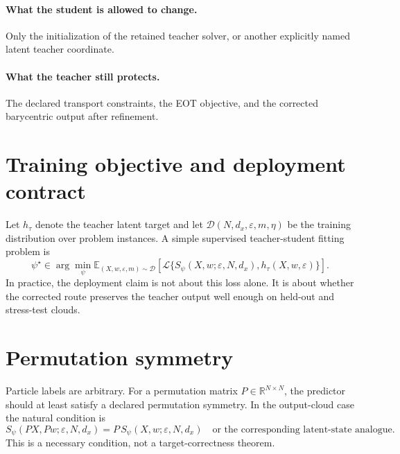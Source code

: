 \paragraph{What the student is allowed to change.}
Only the initialization of the retained teacher solver, or another explicitly
named latent teacher coordinate.

\paragraph{What the teacher still protects.}
The declared transport constraints, the EOT objective, and the corrected
barycentric output after refinement.

\section{Training objective and deployment contract}
\label{sec:bf-learned-ot-training-objective}

Let \(h_\tau\) denote the teacher latent target and let
\(\mathcal D(N,d_x,\varepsilon,m,\eta)\) be the training distribution over
problem instances.  A simple supervised teacher-student fitting problem is
\begin{equation}
\label{eq:bf-learned-ot-training-objective}
  \psi^\star
  \in
  \arg\min_\psi
  \mathbb E_{(X,w,\varepsilon,m)\sim\mathcal D}
  \left[
    \mathcal L\{S_\psi(X,w;\varepsilon,N,d_x),h_\tau(X,w,\varepsilon)
    \}
  \right].
\end{equation}
In practice, the deployment claim is not about this loss alone.  It is about
whether the corrected route preserves the teacher output well enough on held-out
and stress-test clouds.

\section{Permutation symmetry}
\label{sec:bf-learned-ot-symmetry}

Particle labels are arbitrary.  For a permutation matrix
\(P\in\mathbb R^{N\times N}\), the predictor should at least satisfy a declared
permutation symmetry.  In the output-cloud case the natural condition is
\begin{equation}
\label{eq:bf-learned-ot-equivariance}
  S_\psi(PX,Pw;\varepsilon,N,d_x)
  =
  P\,S_\psi(X,w;\varepsilon,N,d_x)
  \quad
  \text{or the corresponding latent-state analogue.}
\end{equation}
This is a necessary condition, not a target-correctness theorem.

